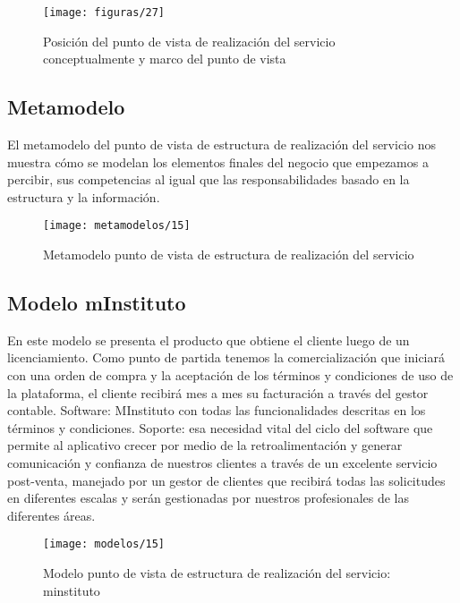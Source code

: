     \begin{figure}[H]
    	\centering
    	\texttt{[image: figuras/27]}
    	\captionsetup{width=.95\textwidth}
    	\caption{Posición del punto de vista de realización del servicio conceptualmente y marco del punto de vista \cite{ref9}}
    	\label{figura27}
    \end{figure}
    
    \subsection{Metamodelo}
    El metamodelo del punto de vista de estructura de realización del servicio nos muestra cómo se modelan los elementos finales del negocio que empezamos a percibir, sus competencias al igual que las responsabilidades basado en la estructura y la información. \cite{ref9}
    
    \begin{figure}[H]
    	\centering
    	\texttt{[image: metamodelos/15]}
    	\captionsetup{width=.95\textwidth}
    	\caption{Metamodelo punto de vista de estructura de realización del servicio \cite{ref9}}
    	\label{metamodelo15}
    \end{figure}
    
    \subsection{Modelo mInstituto}
    En este modelo se presenta el producto que obtiene el cliente luego de un licenciamiento. Como punto de partida tenemos la comercialización que iniciará con una orden de compra y la aceptación de los términos y condiciones de uso de la plataforma, el cliente recibirá mes a mes su facturación a través del gestor contable. Software: MInstituto con todas las funcionalidades descritas en los términos y condiciones. Soporte: esa necesidad vital del ciclo del software que permite al aplicativo crecer por medio de la retroalimentación y generar comunicación y confianza de nuestros clientes a través de un excelente servicio post-venta, manejado por un gestor de clientes que recibirá todas las solicitudes en diferentes escalas y serán gestionadas por nuestros profesionales de las diferentes áreas.
    
    \begin{figure}[H]
    	\centering
    	\texttt{[image: modelos/15]}
    	\captionsetup{width=.95\textwidth}
    	\caption{Modelo punto de vista de estructura de realización del servicio: minstituto}
    	\label{modelo15}
    \end{figure}

